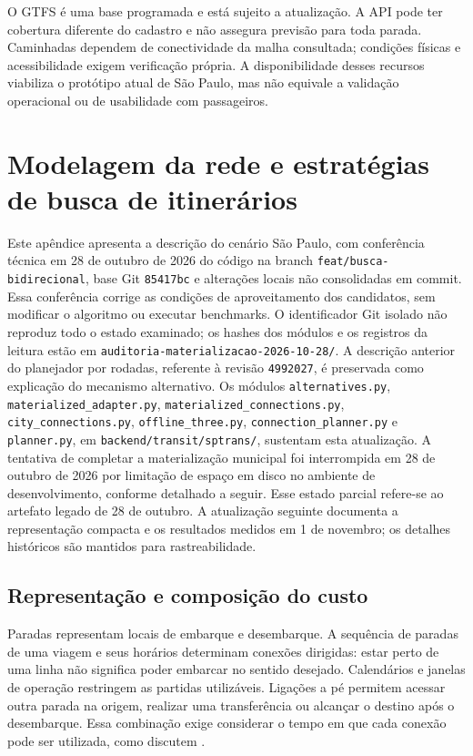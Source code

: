 \documentclass[12pt,oneside,a4paper,brazil,chapter=TITLE]{abntex2}
\let\papsection\section
\renewcommand{\section}{\clearpage\papsection}
\begin{document}
\begin{apendicesenv}
O GTFS é uma base programada e está sujeito a atualização. A API pode ter cobertura diferente do cadastro e não assegura previsão para toda parada. Caminhadas dependem de conectividade da malha consultada; condições físicas e acessibilidade exigem verificação própria. A disponibilidade desses recursos viabiliza o protótipo atual de São Paulo, mas não equivale a validação operacional ou de usabilidade com passageiros.

\chapter{Modelagem da rede e estratégias de busca de itinerários}
\label{ap:rotas}
Este apêndice apresenta a descrição do cenário São Paulo, com conferência técnica em 28 de outubro de 2026 do código na branch \nolinkurl{feat/busca-bidirecional}, base Git \texttt{85417bc} e alterações locais não consolidadas em commit. Essa conferência corrige as condições de aproveitamento dos candidatos, sem modificar o algoritmo ou executar benchmarks. O identificador Git isolado não reproduz todo o estado examinado; os hashes dos módulos e os registros da leitura estão em \nolinkurl{auditoria-materializacao-2026-10-28/}. A descrição anterior do planejador por rodadas, referente à revisão \texttt{4992027}, é preservada como explicação do mecanismo alternativo. Os módulos \nolinkurl{alternatives.py}, \nolinkurl{materialized_adapter.py}, \nolinkurl{materialized_connections.py}, \nolinkurl{city_connections.py}, \nolinkurl{offline_three.py}, \nolinkurl{connection_planner.py} e \nolinkurl{planner.py}, em \nolinkurl{backend/transit/sptrans/}, sustentam esta atualização. A tentativa de completar a materialização municipal foi interrompida em 28 de outubro de 2026 por limitação de espaço em disco no ambiente de desenvolvimento, conforme detalhado a seguir. Esse estado parcial refere-se ao artefato legado de 28 de outubro. A atualização seguinte documenta a representação compacta e os resultados medidos em 1 de novembro; os detalhes históricos são mantidos para rastreabilidade.





\section{Representação e composição do custo}
Paradas representam locais de embarque e desembarque. A sequência de paradas de uma viagem e seus horários determinam conexões dirigidas: estar perto de uma linha não significa poder embarcar no sentido desejado. Calendários e janelas de operação restringem as partidas utilizáveis. Ligações a pé permitem acessar outra parada na origem, realizar uma transferência ou alcançar o destino após o desembarque. Essa combinação exige considerar o tempo em que cada conexão pode ser utilizada, como discutem \citet{bast2015}.


\end{apendicesenv}
\end{document}
